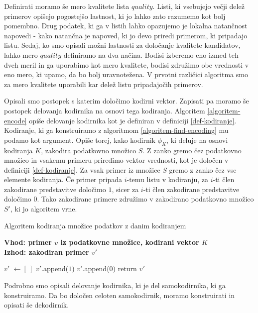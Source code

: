 \documentclass[12pt,a4paper]{article}
\begin{document}
Definirati moramo še mero kvalitete lista $quality$. Listi, ki vsebujejo večji delež primerov opišejo pogostejšo lastnost, ki jo lahko zato razumemo kot bolj pomembno. 
Drug podatek, ki ga v listih lahko opazujemo je lokalna natančnost napovedi - kako natančna je napoved, ki jo devo priredi primerom, ki pripadajo listu. 
Sedaj, ko smo opisali možni lastnosti za določanje kvalitete kandidatov, lahko mero $quality$ definiramo na dva načina. 
Bodisi izberemo eno izmed teh dveh meril in ga uporabimo kot mero kvalitete, bodisi združimo obe vrednosti v eno mero, ki upamo, da bo bolj uravnotežena. 
V prvotni različici algoritma smo za mero kvalitete uporabili kar delež listu pripadajočih primerov.

Opisali smo postopek s katerim določimo kodirni vektor. Zapisati pa moramo še postopek delovanja kodirnika na osnovi tega kodiranja.
Algoritem \ref{algoritem-encode} opiše delovanje kodirnika kot je definiran v definiciji \ref{def-kodiranje}. Kodiranje, ki ga konstruiramo z algoritmom \ref{algoritem-find-encoding} mu podamo kot argument.
Opiše torej, kako kodirnik $\phi_K$, ki deluje na osnovi kodiranja $K$, zakodira podatkovno množico $S$. Z zanko gremo čez podatkovno množico in vsakemu primeru priredimo vektor vrednosti, kot je določen v definiciji \ref{def-kodiranje}.
Za vsak primer iz množice $S$ gremo z zanko čez vse elemente kodiranja. 
Če primer pripada $i$-temu listu v kodiranju, za $i$-ti člen zakodirane predstavitve določimo $1$, sicer za $i$-ti člen zakodirane predstavitve določimo $0$.
Tako zakodirane primere združimo v zakodirano podatkovno množico $S'$, ki jo algoritem vrne.

\begin{algorithm}[ht]
  \caption{Algoritem kodiranja množice podatkov z danim kodiranjem}
  \label{algoritem-encode}
  \raggedright
  \textbf{Vhod: primer $v$ iz podatkovne množice, kodirani vektor $K$}  \\
  \textbf{Izhod: zakodiran primer $v'$} 
  \begin{algorithmic}[1]
	\State $v'$ $\gets [\ ]$
			\State $v'$.append($1$)
		\Else
			\State $v'$.append($0$)
		\EndIf
	\EndFor
	\State return $v'$
  \end{algorithmic}
\end{algorithm}

Podrobno smo opisali delovanje kodirnika, ki je del samokodirnika, ki ga konstruiramo. 
Da bo določen celoten samokodirnik, moramo konstruirati in opisati še dekodirnik.
\end{document}
